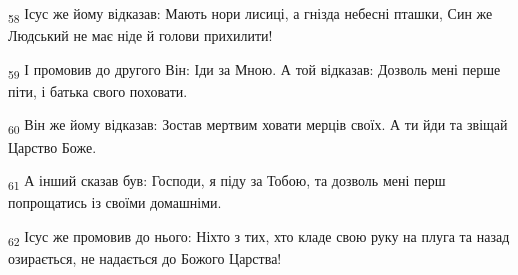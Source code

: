 \begin{tcolorbox}
\textsubscript{58} Ісус же йому відказав: Мають нори лисиці, а гнізда небесні пташки, Син же Людський не має ніде й голови прихилити!
\end{tcolorbox}
\begin{tcolorbox}
\textsubscript{59} І промовив до другого Він: Іди за Мною. А той відказав: Дозволь мені перше піти, і батька свого поховати.
\end{tcolorbox}
\begin{tcolorbox}
\textsubscript{60} Він же йому відказав: Зостав мертвим ховати мерців своїх. А ти йди та звіщай Царство Боже.
\end{tcolorbox}
\begin{tcolorbox}
\textsubscript{61} А інший сказав був: Господи, я піду за Тобою, та дозволь мені перш попрощатись із своїми домашніми.
\end{tcolorbox}
\begin{tcolorbox}
\textsubscript{62} Ісус же промовив до нього: Ніхто з тих, хто кладе свою руку на плуга та назад озирається, не надається до Божого Царства!
\end{tcolorbox}
